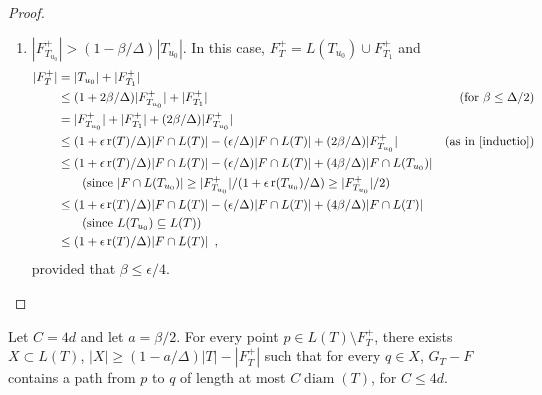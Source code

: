 \documentclass{patmorin}
\DeclareMathOperator{\rank}{r}
\DeclareMathOperator{\diam}{diam}
\begin{document}
\begin{proof}
\begin{enumerate}
\begin{enumerate}
       \item $|F^+_{T_{u_0}}| > (1-\beta/\Delta)|T_{u_0}|$. In this case, $F^+_T=L(T_{u_0}) \cup F^+_{T_1}$ and
       \begin{align*}
          |F^+_T| 
            & = |T_{u_0}| + |F^+_{T_1}| \\
            & \le (1+2\beta/\Delta)|F^+_{T_{u_0}}| + |F^+_{T_1}|
              & \text{(for $\beta\le \Delta/2$)}\\
            & = |F^+_{T_{u_0}}| + |F^+_{T_1}| + (2\beta/\Delta)|F^+_{T_{u_0}}| \\
            & \le (1+\epsilon\rank(T)/\Delta)|F\cap L(T)| - (\epsilon/\Delta)|F\cap L(T)| + (2\beta/\Delta)|F^+_{T_{u_0}}| 
             & \text{(as in \eqref{inductio})} \\
            & \le (1+\epsilon\rank(T)/\Delta)|F\cap L(T)| - (\epsilon/\Delta)|F\cap L(T)| + (4\beta/\Delta)|F\cap L(T_{u_0})|  \\
              & \qquad \text{(since $|F\cap L(T_{u_0})| \ge |F^+_{T_{u_0}}|/(1+\epsilon\rank(T_{u_0})/\Delta)\ge|F^+_{T_{u_0}}|/2$)}\\
            & \le (1+\epsilon\rank(T)/\Delta)|F\cap L(T)| - (\epsilon/\Delta)|F\cap L(T)| + (4\beta/\Delta)|F\cap L(T)| \\
              & \qquad \text{(since $L(T_{u_0})\subseteq L(T)$)} \\
            & \le (1+\epsilon\rank(T)/\Delta)|F\cap L(T)| \enspace ,
       \end{align*}
       provided that $\beta \le \epsilon/4$. \qedhere
     \end{enumerate}
   \end{enumerate}
\end{proof}


\begin{clm}
  Let $C=4d$ and let $a=\beta/2$.  For
  every point $p\in L(T)\setminus F^+_T$, there exists $X\subset L(T)$,
  $|X|\ge (1-a/\Delta)|T|-|F^+_T|$ such that for every $q\in X$,
  $G_T-F$ contains a path from $p$ to $q$ of length at most $C\diam(T)$,
  for $C\le 4d$.
\end{clm}
\end{document}
